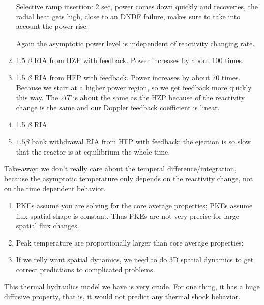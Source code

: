 \documentclass{school-22.211-notes}
\begin{document}
\begin{enumerate}
Selective ramp insertion: 2 sec, power comes down quickly and recoveries, the radial heat gets high, close to an DNDF failure, makes sure to take into account the power rise. 

Again the asymptotic power level is independent of reactivity changing rate. 


\item 1.5 $\beta$ RIA from HZP with feedback. Power increases by about 100 times. 


\item 1.5 $\beta$ RIA from HFP with feedback. Power increases by about 70 times. Because we start at a higher power region, so we get feedback more quickly this way. The $\Delta T$ is about the same as the HZP because of the reactivity change is the same and our Doppler feedback coefficient is linear. 

\item 1.5 $\beta$ RIA  


\item $1.5 \beta$ bank withdrawal RIA from HFP with feedback: the ejection is so slow that the reactor is at equilibrium the whole time. 
\end{enumerate}
Take-away: we don't really care about the temperal difference/integration, because the asymptotic temperature only depends on the reactivity change, not on the time dependent behavior. 



\clearpage
{}
\begin{enumerate}
\item PKEs assume you are solving for the core average properties; PKEs assume flux spatial shape is constant. Thus PKEs are not very precise for large spatial flux changes. 
\item Peak temperature are proportionally larger than core average properties;
\item If we relly want spatial dynamics, we need to do 3D spatial dynamics to get correct predictions to complicated problems. 
\end{enumerate}
This thermal hydraulics model we have is very crude. For one thing, it has a huge diffusive property, that is, it would not predict any thermal shock behavior. 
\end{document}

